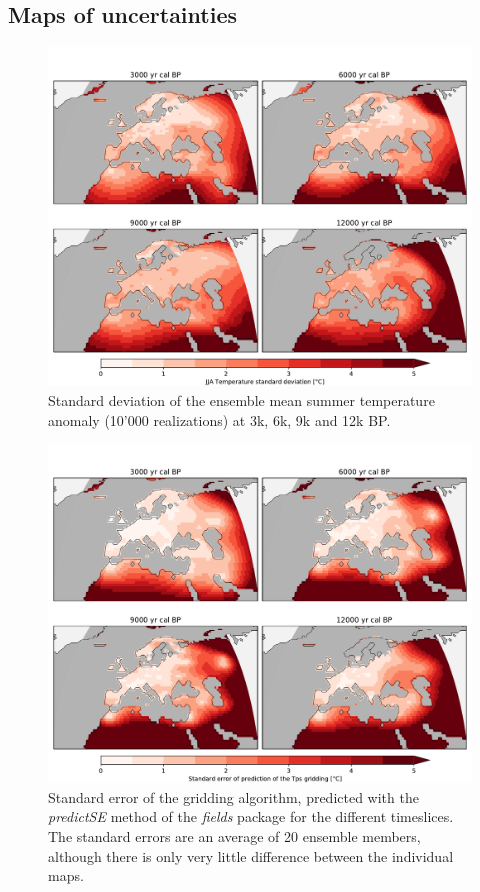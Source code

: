 \begin{refsection}
\begin{subappendices}
	\section{Maps of uncertainties} \label{sec:gridding-suppl-maps}
		\begin{figure}[h]
			\includegraphics[width=\linewidth]{gridding-figures/ensemble-std.pdf}
			\caption[Ensemble standard deviation]{Standard deviation of the ensemble mean summer temperature anomaly (10'000 realizations) at 3k, 6k, 9k and 12k BP.}
			\label{fig:gridding-gridded-std}
		\end{figure}
	
		\begin{figure}[h]
			\includegraphics[width=\linewidth]{gridding-figures/ensemble-tps-se.pdf}
			\caption[Standard error of the Tps gridding method]{Standard error of the gridding algorithm, predicted with the \textit{predictSE} method of the \textit{fields} package \citep{NychkaFurrerPaigeEtAl2017} for the different timeslices. The standard errors are an average of 20 ensemble members, although there is only very little difference between the individual maps.}
			\label{fig:gridding-tps-se}
		\end{figure}


\end{subappendices}
\end{refsection}

